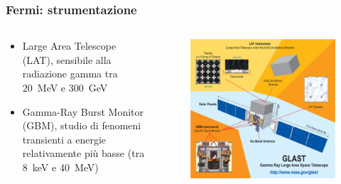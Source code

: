 \documentclass[utf8,9pt]{beamer}
\begin{document}
\begin{frame}
  \frametitle{Fermi: strumentazione}
  \begin{columns}
    \begin{column}{0.4\columnwidth}
      \begin{itemize}
      \item Large Area Telescope (LAT), sensibile alla radiazione gamma tra
        \SI{20}{\mega\electronvolt} e \SI{300}{\giga\electronvolt}
      \item Gamma-Ray Burst Monitor (GBM), studio di fenomeni transienti a
        energie relativamente più basse (tra \SI{8}{\kilo\electronvolt} e
        \SI{40}{\mega\electronvolt})
      \end{itemize}
    \end{column}
    \begin{column}{0.6\columnwidth}
      \begin{figure}
        \centering
        \includegraphics[width=\columnwidth]{glast_schematic.jpg}
      \end{figure}
    \end{column}
  \end{columns}
\end{frame}
\end{document}
